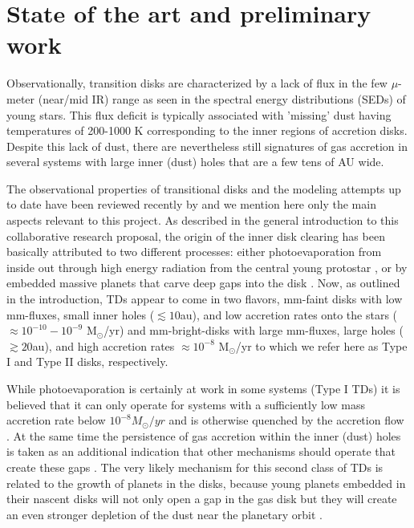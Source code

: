 \documentclass[10pt,fleqn,twoside]{article}
\begin{document}
\section{State of the art and preliminary work}
\renewcommand{\leftmark}{\sc State of the Art and preliminary work}
Observationally, transition disks are characterized by a lack of
flux in the few $\mu$-meter (near/mid IR) range as seen in the spectral energy distributions
(SEDs) of young stars. This flux deficit is typically associated with
'missing' dust having temperatures of 200-1000 K 
\citep{2002ApJ...568.1008C,2005ApJ...621..461D}
corresponding to the inner regions of accretion disks. Despite this lack of dust,
there are nevertheless still signatures of gas accretion in several systems with large inner (dust) holes
that are a few tens of AU wide. 

The observational properties of transitional disks and the modeling attempts up to date
have been reviewed recently by \citet{2016PASA...33....5O} and we mention here only the main aspects 
relevant to this project.
As described in the general introduction to this collaborative research proposal,
the origin of the inner disk clearing has been basically attributed to two different processes:
either photoevaporation from inside out through high energy radiation from the central young protostar
\citep[e.g.][]{1993Icar..106...92S,2006MNRAS.369..216A}, 
or by embedded massive planets that carve deep gaps into the disk \citep[e.g.,][]{2006ApJ...640.1110V}.
Now, as outlined in the introduction, TDs appear to come in two flavors, 
mm-faint disks with low mm-fluxes, small inner holes ($\lesssim 10$au), and low accretion rates
onto the stars ($\approx 10^{-10} - 10^{-9}$ M$_\odot$/yr)
and mm-bright-disks with large mm-fluxes, large holes ($\gtrsim 20$au), and high accretion rates
$\approx 10^{-8}$ M$_\odot$/yr \citep{2012MNRAS.426L..96O} to which we
refer here as  
Type I and Type II disks, respectively.

While photoevaporation is certainly at work in some systems (Type I TDs) it is believed that it can only
operate for systems with a sufficiently low mass accretion rate below $10^{-8} M_\odot/yr$
and is otherwise quenched by the accretion flow \citep{2012MNRAS.426L..96O}.
At the same time the persistence of gas accretion within the inner (dust) holes is taken as an additional
indication that other mechanisms should operate that create these gaps \citep{2014A&A...568A..18M}.
The very likely mechanism for this second class of TDs is related to the growth of planets in the disks,
because young planets embedded in their nascent disks will not only
open a gap in the gas disk but they will create an even stronger
depletion of the dust near the planetary orbit \citep{2004A&A...425L...9P}.
\end{document}

